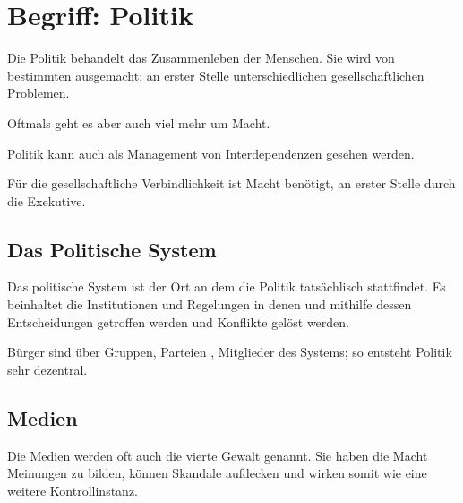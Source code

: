 \documentclass{article}
\begin{document}
\section{Begriff: Politik} 
Die Politik behandelt das Zusammenleben der Menschen. Sie wird von bestimmten  ausgemacht; an erster Stelle unterschiedlichen gesellschaftlichen Problemen.

Oftmals geht es aber auch viel mehr um Macht.

Politik kann auch als Management von Interdependenzen gesehen werden.

Für die gesellschaftliche Verbindlichkeit ist Macht benötigt, an erster Stelle durch die Exekutive.

\subsection{Das Politische System}
Das politische System ist der Ort an dem die Politik tatsächlisch stattfindet. Es beinhaltet die Institutionen und Regelungen in denen und mithilfe dessen Entscheidungen getroffen werden und Konflikte gelöst werden.

Bürger sind über Gruppen, Parteien \usw, Mitglieder des Systems; so entsteht Politik sehr dezentral.

\subsection{Medien}
Die Medien werden oft auch die vierte Gewalt genannt. Sie haben die Macht Meinungen zu bilden, können Skandale aufdecken und wirken somit wie eine weitere Kontrollinstanz.
\end{document}
